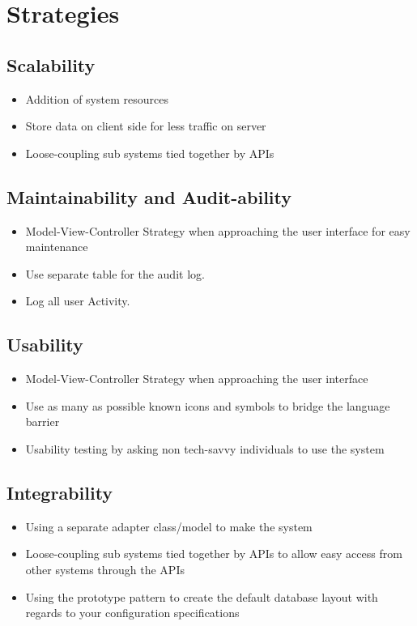 
\section{Strategies}
	\subsection{Scalability}
		\begin{itemize}
			\item Addition of system resources
			\item Store data on client side for less traffic on server
			\item Loose-coupling sub systems tied together by APIs
		\end{itemize}
	\subsection{Maintainability and Audit-ability}
		\begin{itemize}
			\item Model-View-Controller Strategy when approaching the user interface for easy maintenance
			\item Use separate table for the audit log.
			\item Log all user Activity.
		\end{itemize}
	\subsection{Usability}
		\begin{itemize}
			\item Model-View-Controller Strategy when approaching the user interface
			\item Use as many as possible known icons and symbols to bridge the language barrier
			\item Usability testing by asking non tech-savvy individuals to use the system 
		\end{itemize}
	\subsection{Integrability}
		\begin{itemize}
			\item Using a separate adapter class/model to make the system 
			\item Loose-coupling sub systems tied together by APIs to allow easy access from other systems through the APIs
			\item Using the prototype pattern to create the default database layout with regards to your configuration specifications
		\end{itemize}
